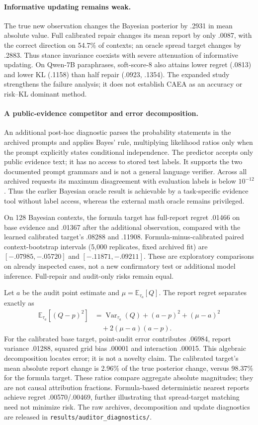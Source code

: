 \documentclass[10pt]{article}
\begin{document}
\paragraph{Informative updating remains weak.}
The true new observation changes the Bayesian posterior by .2931 in mean
absolute value. Full calibrated repair changes its mean report by only
.0087, with the correct direction on 54.7\% of contexts; an oracle spread
target changes by .2883. Thus stance invariance coexists with severe
attenuation of informative updating. On Qwen-7B paraphrases, soft-score-8
also attains lower regret (.0813) and lower KL (.1158) than half repair
(.0923, .1354). The expanded study strengthens the failure analysis; it does
not establish CAEA as an accuracy or risk--KL dominant method.

\paragraph{A public-evidence competitor and error decomposition.}
An additional post-hoc diagnostic parses the probability statements in the
archived prompts and applies Bayes' rule, multiplying likelihood ratios only
when the prompt explicitly states conditional independence. The predictor
accepts only public evidence text; it has no access to stored test labels.
It supports the two documented prompt grammars and is not a general
language verifier. Across all archived requests its maximum disagreement
with evaluation labels is below $10^{-12}$. Thus the earlier Bayesian
oracle result is achievable by a task-specific evidence tool without
label access, whereas the external math oracle remains privileged.

On 128 Bayesian contexts, the formula target has full-report regret .01466
on base evidence and .01367 after the additional observation, compared with
the learned calibrated target's .08288 and .11908. Formula-minus-calibrated
paired context-bootstrap intervals (5,000 replicates, fixed archived fit)
are $[-.07985,-.05720]$ and $[-.11871,-.09211]$. These are exploratory
comparisons on already inspected cases, not a new confirmatory test or
additional model inference. Full-repair and audit-only risks remain equal.

Let $a$ be the audit point estimate and $\mu=\mathbb E_{\tau_a}[Q]$.
The report regret separates exactly as
\begin{align*}
 \mathbb E_{\tau_a}[(Q-p)^2]
 &=\operatorname{Var}_{\tau_a}(Q)+(a-p)^2+(\mu-a)^2\\
 &\quad+2(\mu-a)(a-p).
\end{align*}
For the calibrated base target, point-audit error contributes .06984,
report variance .01288, squared grid bias .00001 and interaction .00015.
This algebraic decomposition locates error; it is not a novelty claim.
The calibrated target's mean absolute report change is 2.96\% of the true
posterior change, versus 98.37\% for the formula target. These ratios compare
aggregate absolute magnitudes; they are not causal attribution fractions.
Formula-based deterministic nearest reports achieve regret .00570/.00469,
further illustrating that spread-target matching need not minimize risk.
The raw archives, decomposition and update diagnostics are released in
\texttt{results/auditor\_diagnostics/}.
\end{document}
